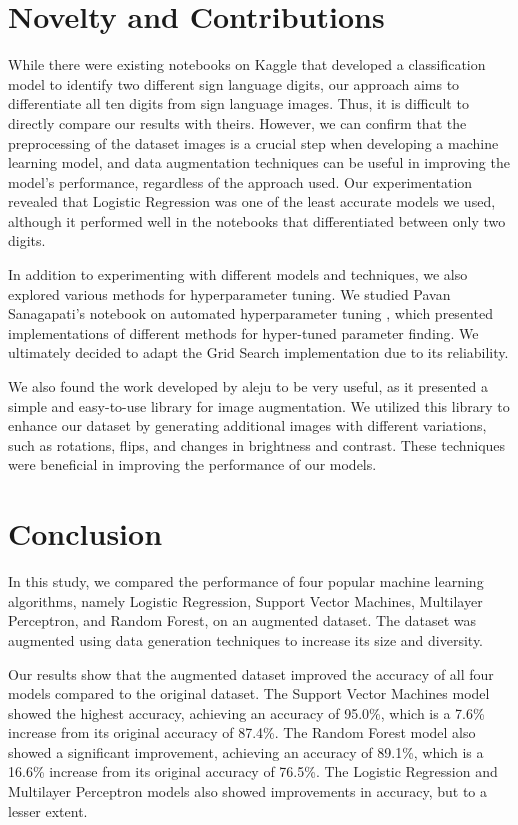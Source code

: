 \documentclass[conference]{IEEEtran}
\begin{document}
\section{Novelty and Contributions}
While there were existing notebooks on Kaggle that developed a classification model to identify two different sign language digits, our approach aims to differentiate all ten digits from sign language images. Thus, it is difficult to directly compare our results with theirs. However, we can confirm that the preprocessing of the dataset images is a crucial step when developing a machine learning model, and data augmentation techniques can be useful in improving the model's performance, regardless of the approach used. Our experimentation revealed that Logistic Regression was one of the least accurate models we used, although it performed well in the notebooks that differentiated between only two digits.

In addition to experimenting with different models and techniques, we also explored various methods for hyperparameter tuning. We studied Pavan Sanagapati's notebook on automated hyperparameter tuning \cite{hypertuning}, which presented implementations of different methods for hyper-tuned parameter finding. We ultimately decided to adapt the Grid Search implementation due to its reliability.

We also found the work developed by aleju \cite{imgaug} to be very useful, as it presented a simple and easy-to-use library for image augmentation. We utilized this library to enhance our dataset by generating additional images with different variations, such as rotations, flips, and changes in brightness and contrast. These techniques were beneficial in improving the performance of our models.
\section{Conclusion}

In this study, we compared the performance of four popular machine learning algorithms, namely Logistic Regression, Support Vector Machines, Multilayer Perceptron, and Random Forest, on an augmented dataset. The dataset was augmented using data generation techniques to increase its size and diversity.

Our results show that the augmented dataset improved the accuracy of all four models compared to the original dataset. The Support Vector Machines model showed the highest accuracy, achieving an accuracy of 95.0\%, which is a 7.6\% increase from its original accuracy of 87.4\%. The Random Forest model also showed a significant improvement, achieving an accuracy of 89.1\%, which is a 16.6\% increase from its original accuracy of 76.5\%. The Logistic Regression and Multilayer Perceptron models also showed improvements in accuracy, but to a lesser extent.
\end{document}
